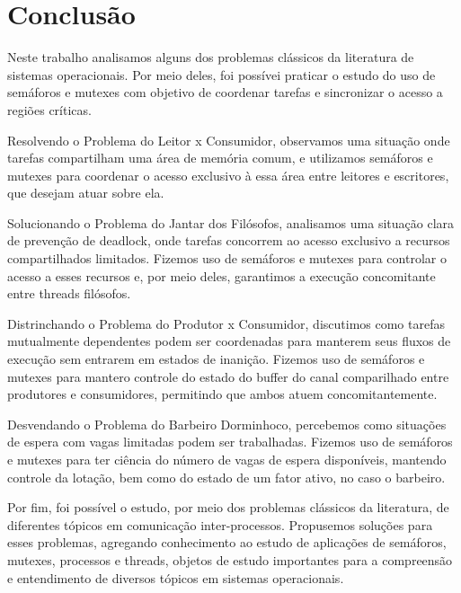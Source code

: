 \documentclass[
	12pt,				%
	openright,			%
	oneside,			%
	a4paper,			%
	chapter=TITLE,		%
	english,			%
	french,				%
	spanish,			%
	brazil				%
	]{abntex2}
\theoremstyle{definition}
\begin{document}
\chapter{Conclusão}

Neste trabalho analisamos alguns dos problemas clássicos da literatura de sistemas operacionais. Por meio deles, foi possívei praticar o estudo do uso de semáforos e mutexes com objetivo de coordenar tarefas e sincronizar o acesso a regiões críticas.

Resolvendo o Problema do Leitor x Consumidor, observamos uma situação onde tarefas compartilham uma área de memória comum, e utilizamos semáforos e mutexes para coordenar o acesso exclusivo à essa área entre leitores e escritores, que desejam atuar sobre ela.

Solucionando o Problema do Jantar dos Filósofos, analisamos uma situação clara de prevenção de deadlock, onde tarefas concorrem ao acesso exclusivo a recursos compartilhados limitados. Fizemos uso de semáforos e mutexes para controlar o acesso a esses recursos e, por meio deles, garantimos a execução concomitante entre threads filósofos. 

Distrinchando o Problema do Produtor x Consumidor, discutimos como tarefas mutualmente dependentes podem ser coordenadas para manterem seus fluxos de execução sem entrarem em estados de inanição. Fizemos uso de semáforos e mutexes para mantero controle do estado do buffer do canal comparilhado entre produtores e consumidores, permitindo que ambos atuem concomitantemente.

Desvendando o Problema do Barbeiro Dorminhoco, percebemos como situações de espera com vagas limitadas podem ser trabalhadas. Fizemos uso de semáforos e mutexes para ter ciência do número de vagas de espera disponíveis, mantendo controle da lotação, bem como do estado de um fator ativo, no caso o barbeiro.

Por fim, foi possível o estudo, por meio dos problemas clássicos da literatura, de diferentes tópicos em comunicação inter-processos. Propusemos soluções para esses problemas, agregando conhecimento ao estudo de aplicações de semáforos, mutexes, processos e threads, objetos de estudo importantes para a compreensão e entendimento de diversos tópicos em sistemas operacionais.

\postextual



\cite{tanenbaum2010sistemas}
\end{document}
